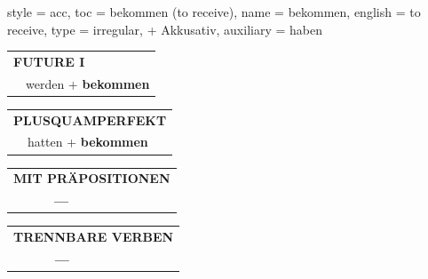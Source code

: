 \begin{verbentry}{
  style = {acc},
  toc = {bekommen (to receive)},
  name = {bekommen},
  english = {to receive},
  type = {irregular, + Akkusativ},
  auxiliary = {haben}
}
\begin{tabular}{rl}
    \multicolumn{2}{l}{\textbf{FUTURE I} }\\
  &  werden + \textbf{bekommen}\\
 
  \end{tabular}
\hfill
   \begin{tabular}{rl}
      \multicolumn{2}{l}{\textbf{PLUSQUAMPERFEKT}}\\
  &  hatten + \textbf{bekommen}\\
  \end{tabular}
  
\vspace{10pt}

\begin{tabular}{lll}
\multicolumn{3}{l}{\textbf{MIT PRÄPOSITIONEN}}\\
& \textbf{---} & \\
\end{tabular}
\hfill
\begin{tabular}{lll}
\multicolumn{3}{l}{\textbf{TRENNBARE VERBEN}}\\
& \textbf{---} & \\
\end{tabular}

\vspace{-5pt}
\end{verbentry}

